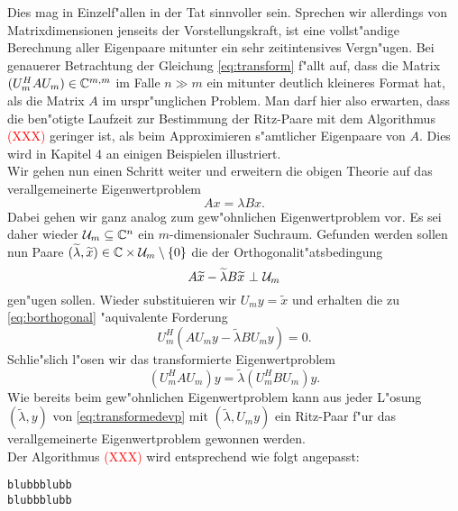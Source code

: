 Dies mag in Einzelf"allen in der Tat sinnvoller sein. Sprechen wir allerdings
von Matrixdimensionen jenseits der Vorstellungskraft, ist eine vollst"andige
Berechnung aller Eigenpaare mitunter ein sehr zeitintensives Vergn"ugen. Bei
genauerer Betrachtung der Gleichung \eqref{eq:transform} f"allt auf, dass die
Matrix $(U_m^H A U_m) \in \mathbb{C}^{m,m}$ im Falle $n \gg m$ ein mitunter deutlich kleineres
Format hat, als die Matrix $A$ im urspr"unglichen Problem. Man darf hier also erwarten,
dass die ben"otigte Laufzeit zur Bestimmung der Ritz-Paare mit dem Algorithmus \textcolor{red}{(XXX)}
geringer ist, als beim Approximieren s"amtlicher Eigenpaare von $A$. Dies
wird in Kapitel 4 an einigen Beispielen illustriert.\\

Wir gehen nun einen Schritt weiter und erweitern die obigen Theorie auf das
verallgemeinerte Eigenwertproblem
\[
Ax = \lambda Bx.
\]
Dabei gehen wir ganz analog zum gew"ohnlichen Eigenwertproblem vor.
Es sei daher wieder $\mathcal{U}_m\subseteq \mathbb{C}^n$ ein $m$-dimensionaler Suchraum.
Gefunden werden sollen nun Paare $ (\widetilde{\lambda}, \widetilde{x}) \in \mathbb{C}
\times \mathcal{U}_m \setminus\{ 0\}$ die der Orthogonalit"atsbedingung
\begin{equation}\label{eq:borthogonal}
A\widetilde{x} - \widetilde{\lambda}B\widetilde{x} \ \bot \ \U_m
\end{equation}
gen"ugen sollen. Wieder substituieren wir $U_m y=\widetilde{x}$ und erhalten die
zu \eqref{eq:borthogonal} "aquivalente Forderung
\[
U_m^H(AU_m y - \widetilde{\lambda} BU_m y) = 0.
\]
Schlie"slich l"osen wir das transformierte Eigenwertproblem
\begin{equation}\label{eq:transformedevp}
(U_m^H AU_m) y = \widetilde{\lambda} (U_m^H B U_m) y.
\end{equation}
Wie bereits beim gew"ohnlichen Eigenwertproblem kann aus jeder L"osung $(\widetilde{\lambda}, y)$ von \eqref{eq:transformedevp}
mit $(\widetilde{\lambda}, U_m y)$ ein Ritz-Paar f"ur das verallgemeinerte Eigenwertproblem
gewonnen werden.\\

Der Algorithmus \textcolor{red}{(XXX)} wird entsprechend wie folgt angepasst:

\begin{lstlisting}[caption = Verallgemeinertes Rayleigh-Ritz-Verfahren (Vgl. ~\cite{ptep} Algorithmus A\text{,} S. 356 \textcolor{red}{wie richtig angeben?}), captionpos=b]
blubbblubb
blubbblubb
\end{lstlisting}

